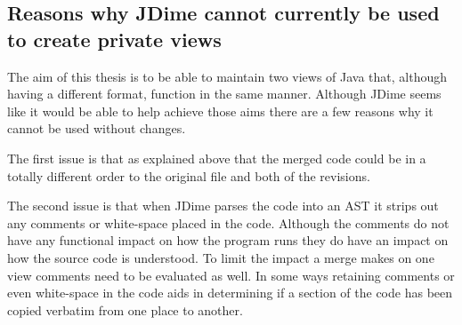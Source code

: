 \subsection{Reasons why JDime cannot currently be used to create private views}
\label{sec:notJdime}
The aim of this thesis is to be able to maintain two views of Java that, although having a different format, function in the same manner.  Although JDime seems like it would be able to help achieve those aims there are a few reasons why it cannot be used without changes.

The first issue is that as explained above that the merged code could be in a totally different order to the original file and both of the revisions.

The second issue is that when JDime parses the code into an AST it strips out any comments or white-space placed in the code.  Although the comments do not have any functional impact on how the program runs they do have an impact on how the source code is understood.  To limit the impact a merge makes on one view comments need to be evaluated as well. In some ways retaining comments or even white-space in the code aids in determining if a section of the code has been copied verbatim from one place to another.


